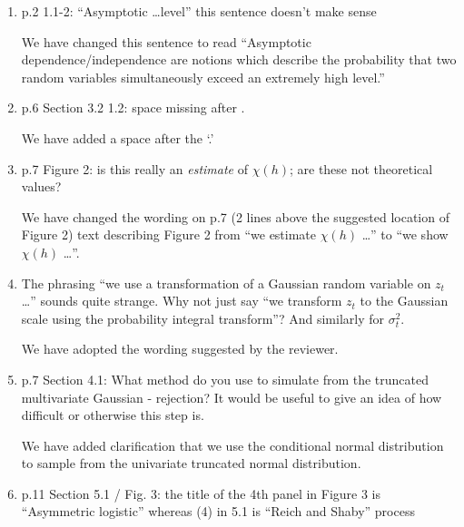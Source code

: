 \documentclass[11pt]{article}
\begin{document}
\begin{enumerate}[1.]
	\item p.2 1.1-2: ``Asymptotic \ldots level'' this sentence doesn't make sense

	\begin{response}
	We have changed this sentence to read ``Asymptotic dependence/independence are notions which describe the probability that two random variables simultaneously exceed an extremely high level.''
	\end{response}
	
	\item p.6 Section 3.2 1.2: space missing after .
	
	\begin{response}
	We have added a space after the `.'
	\end{response}
	
	\item p.7 Figure 2: is this really an \emph{estimate} of $\chi(h)$; are these not theoretical values?
	
	\begin{response}
	We have changed the wording on p.7 (2 lines above the suggested location of Figure 2) text describing Figure 2 from ``we estimate $\chi(h)$ \ldots'' to ``we show $\chi(h)$ \ldots''.
	\end{response}

	\item The phrasing ``we use a transformation of a Gaussian random variable on $z_t$\ldots'' sounds quite strange. Why not just say ``we transform $z_t$ to the Gaussian scale using the probability integral transform''? And similarly for $\sigma^2_t$.
	
	\begin{response}
	We have adopted the wording suggested by the reviewer.
	\end{response}
	
	\item p.7 Section 4.1: What method do you use to simulate from the truncated multivariate Gaussian - rejection? It would be useful to give an idea of how difficult or otherwise this step is.
	
	\begin{response}
	We have added clarification that we use the conditional normal distribution to sample from the univariate truncated normal distribution.
	\end{response}
	
	\item p.11 Section 5.1 / Fig. 3: the title of the 4th panel in Figure 3 is ``Asymmetric logistic'' whereas (4) in 5.1 is ``Reich and Shaby'' process
	

\end{enumerate}
\end{document}
